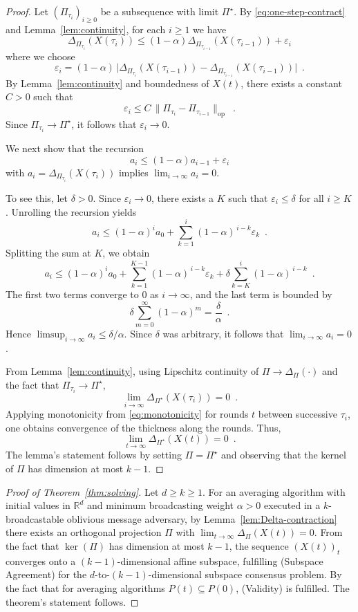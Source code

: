 \documentclass[a4paper,USenglish]{lipics-v2021}
\newcommand{\IR}{\mathbb{R}}
\renewcommand{\le}{\leqslant}
\renewcommand{\ge}{\geqslant}
\renewcommand{\geq}{\geqslant}
\begin{document}
\begin{proof}
	Let $(\Pi_{\tau_i})_{i \geq 0}$ be a subsequence with limit $\Pi^\star$.
	By \eqref{eq:one-step-contract} and Lemma~\ref{lem:continuity}, for each $i \geq 1$ we have
	\[
		\Delta_{\Pi_{\tau_i}}(X(\tau_i))
		\le (1-\alpha)\Delta_{\Pi_{\tau_{i-1}}}(X(\tau_{i-1}))
		+ \varepsilon_i
	\]
	where we choose
	\[
		\varepsilon_i = (1-\alpha)\,
		\big|
		\Delta_{\Pi_{\tau_i}}(X(\tau_{i-1}))
		-
		\Delta_{\Pi_{\tau_{i-1}}}(X(\tau_{i-1}))
		\big| \enspace.
	\]
	By Lemma~\ref{lem:continuity} and boundedness of $X(t)$, there exists a constant $C>0$ such that
	\[
		\varepsilon_i \le C \,\|\Pi_{\tau_i}-\Pi_{\tau_{i-1}}\|_{\mathrm{op}} \enspace.
	\]
	Since $\Pi_{\tau_i} \to \Pi^\star$, it follows that $\varepsilon_i \to 0$.

	We next show that the recursion
	\[
		a_i \le (1-\alpha)a_{i-1} + \varepsilon_i
	\]
	with $a_i = \Delta_{\Pi_{\tau_i}}(X(\tau_i))$ implies
	$
		\lim_{i\to\infty} a_i = 0
	$.

	To see this, let $\delta>0$.
	Since $\varepsilon_i \to 0$, there exists a $K$ such that
	$\varepsilon_i \le \delta$ for all $i \ge K$.
	Unrolling the recursion yields
	\[
		a_i
		\le (1-\alpha)^i a_0
		+ \sum_{k=1}^i (1-\alpha)^{\,i-k}\varepsilon_k \enspace.
	\]
	Splitting the sum at $K$, we obtain
	\[
		a_i
		\le (1-\alpha)^i a_0
		+ \sum_{k=1}^{K-1}(1-\alpha)^{\,i-k}\varepsilon_k
		+ \delta \sum_{k=K}^{i}(1-\alpha)^{\,i-k} \enspace.
	\]
	The first two terms converge to $0$ as $i\to\infty$, and the last term is bounded by
	\[
		\delta \sum_{m=0}^{\infty}(1-\alpha)^m = \frac{\delta}{\alpha} \enspace.
	\]
	Hence $\limsup_{i\to\infty} a_i \le \delta/\alpha$.
	Since $\delta$ was arbitrary, it follows that $\lim_{i\to\infty} a_i = 0$.


	From Lemma~\ref{lem:continuity}, using Lipschitz continuity of $\Pi \to \Delta_\Pi(\cdot)$
	and the fact that $\Pi_{\tau_i} \to \Pi^\star$,
	\[
		\lim_{i \to \infty} \Delta_{\Pi^\star}(X(\tau_i)) = 0\enspace.
	\]
	Applying monotonicity from \eqref{eq:monotonicity} for rounds $t$ between successive $\tau_i$, one obtains convergence of the thickness along the rounds. Thus,
	\[
		\lim_{t \to \infty} \Delta_{\Pi^\star}(X(t)) = 0\enspace.
	\]
	The lemma's statement follows by setting $\Pi = \Pi^\star$ and observing that
	the kernel of $\Pi$ has dimension at most $k-1$.
\end{proof}

\begin{proof}[Proof of Theorem~\ref{thm:solving}]
	Let $d \geq k \geq 1$.
	For an averaging algorithm with initial values in $\IR^d$ and minimum broadcasting weight $\alpha > 0$ executed in a $k$-broadcastable oblivious message adversary, by Lemma~\ref{lem:Delta-contraction}
	there exists an orthogonal projection $\Pi$ with $\lim_{t\to\infty}\Delta_\Pi(X(t)) = 0$.
	From the fact that $\ker(\Pi)$ has dimension at most $k-1$, the sequence
	$(X(t))_t$ converges onto a $(k-1)$-dimensional affine subspace, fulfilling (Subspace Agreement) for the $d$-to-$(k-1)$-dimensional subspace consensus problem.
	By the fact that for averaging algorithms $P(t) \subseteq P(0)$, (Validity) is fulfilled.
	The theorem's statement follows.
\end{proof}
\end{document}
